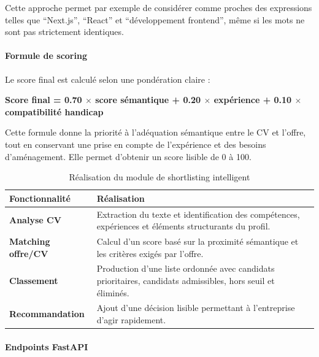 \documentclass[12pt,a4paper]{report}
\newcommand{\tblhead}[1]{\cellcolor{darkblue}\color{white}\bfseries #1}
\newcommand{\tblleft}[1]{\bfseries\color{darkblue} #1}
\begin{document}
Cette approche permet par exemple de considérer comme proches des expressions telles que \enquote{Next.js}, \enquote{React} et \enquote{développement frontend}, même si les mots ne sont pas strictement identiques.

\paragraph{Formule de scoring}

Le score final est calculé selon une pondération claire :

\begin{center}
\Large
\textbf{Score final = 0.70 $\times$ score sémantique + 0.20 $\times$ expérience + 0.10 $\times$ compatibilité handicap}
\end{center}

Cette formule donne la priorité à l'adéquation sémantique entre le CV et l'offre, tout en conservant une prise en compte de l'expérience et des besoins d'aménagement. Elle permet d'obtenir un score lisible de 0 à 100.

\renewcommand{\arraystretch}{1.25}
\begin{table}[H]
\centering
\begin{tabularx}{\textwidth}{|L{4cm}|Y|}
\hline
\tblhead{Fonctionnalité} & \tblhead{Réalisation} \\
\hline
\tblleft{Analyse CV} & Extraction du texte et identification des compétences, expériences et éléments structurants du profil. \\
\hline
\tblleft{Matching offre/CV} & Calcul d'un score basé sur la proximité sémantique et les critères exigés par l'offre. \\
\hline
\tblleft{Classement} & Production d'une liste ordonnée avec candidats prioritaires, candidats admissibles, hors seuil et éliminés. \\
\hline
\tblleft{Recommandation} & Ajout d'une décision lisible permettant à l'entreprise d'agir rapidement. \\
\hline
\end{tabularx}
\caption{Réalisation du module de shortlisting intelligent}
\label{tab:realisation-shortlisting}
\end{table}
\renewcommand{\arraystretch}{1}

\paragraph{Endpoints FastAPI}
\end{document}
